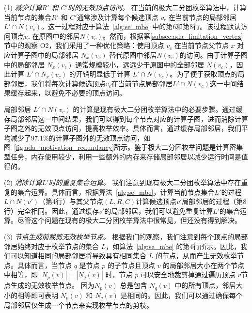 (1) \textit{减少计算$R'$ 和 $C'$时的无效\emph{顶点}访问。} 
在当前的极大二分团枚举算法中，计算当前节点的集合$R'$ 和 $C'$通常涉及计算每个候选顶点 $v_c$ 在当前节点的局部邻居 $L' \cap N(v_c)$。这一过程对应于算法~\ref{alg:se_mbe} 中的第6和第8行。该过程默认访问顶点$v_c$ 在原图中的邻居$N(v_c)$。然而，根据第\ref{subsec:ada_limitation_vertex}节中的观察 O2，我们采用了一种优化策略：使用顶点 $v_c$ 在当前节点父节点 $x$ 对应计算子图中的局部邻居 $N_x(v_c)$ 替代原图中邻居$N(v_c)$的访问。由于计算子图中的局部邻居 $N_x(v_c)$ 通常规模较小，远远少于原图中的全部邻居 $N(v_c)$，因此计算 $L' \cap N_x(v_c)$ 的开销明显低于计算 $L' \cap N(v_c)$。为了便于获取顶点的局部邻居，我们将每次计算候选顶点$v_c$在当前节点局部邻居$L' \cap N(v_c)$这一中间结果缓存起来，以避免不必要的顶点访问。

局部邻居 $L' \cap N(v_c)$ 的计算是现有极大二分团枚举算法中的必要步骤。通过缓存局部邻居这一中间结果，我们可以得到每个节点对应的计算子图，进而消除计算子图之外的无效顶点访问，提高枚举效率。具体而言，通过缓存局部邻居，我们平均减少了97.1\%的计算子图外的无效顶点访问，如图~\ref{fig:ada_motivation_redundancy}所示。鉴于极大二分团枚举问题是计算密集型任务，内存使用较少，利用一些额外的内存来存储局部邻居以减少运行时间是值得的。

(2) \textit{消除计算$L'$时的重复\emph{集合}运算。}
我们注意到现有极大二分团枚举算法中存在重复的集合运算。具体而言，根据算法~\ref{alg:se_mbe}，计算当前节点集合$L'$的过程$L \cap N(v')$（第4行）与其父节点$(L, R, C)$计算候选顶点$v'$局部邻居的过程（第8行）完全相同。因此，通过缓存$v'$的局部邻居，我们可以避免重复计算$L'$的集合运算。尽管这个问题在现有的极大二分团枚举算法中很常见，但还没有得到解决。

(3) \textit{节点生成前裁剪无效\emph{枚举节点}。}
根据我们的观察，我们注意到每个顶点的局部邻居始终对应于枚举节点的集合 $L$，如算法~\ref{alg:se_mbe} 的第4行所示。因此，我们可以知道相同的局部邻居将导致具有相同集合 $L$ 的节点，从而产生无效枚举节点。具体而言，当节点 $q$ 是节点 $p$ 的子节点且顶点 $v$ 的局部邻居大小在两个节点中相等，即 $|N_p(v)| = |N_q(v)|$ 时，节点 $p$ 可以安全地裁剪掉通过遍历顶点 $v$节点生成的无效枚举节点。 因为$N_p(v)$ 总是包含 $N_q(v)$ 中的所有顶点，邻居大小的相等即可表明 $N_p(v)$ 和 $N_q(v)$ 是相同的。因此，我们可以通过确保每个局部邻居仅生成一个节点来实现枚举节点的剪枝。






